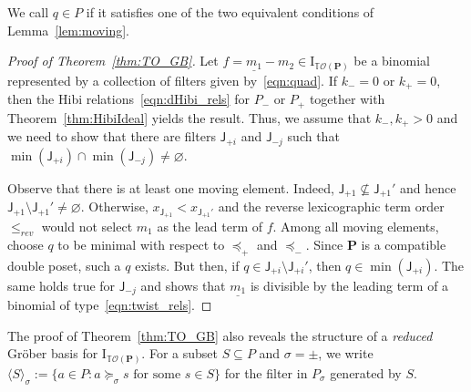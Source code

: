 \documentclass[11pt]{amsart}
\theoremstyle{definition}
\begin{document}
We call $q \in {P}$ {\textbf{\color{black}{moving}}} if it satisfies one of the two equivalent
conditions of Lemma~\ref{lem:moving}.

\begin{proof}[Proof of Theorem~\ref{thm:TO_GB}]
    Let $f = \underline{m_1} - m_2 \in {\mathrm{I}}_{{{\mathbb{T}}{\mathcal{O}({\mathbf{P}})}}}$ be a binomial represented
    by a collection of filters given by~\eqref{eqn:quad}. If $k_- = 0$ or $k_+
    = 0$, then the Hibi relations~\eqref{eqn:dHibi_rels} for ${P}_-$ or ${P}_+$
    together with Theorem~\ref{thm:HibiIdeal} yields the result. Thus, we
    assume that $k_-,k_+ > 0$ and we need to show that there are filters
    ${\mathsf{J}}_{+i}$ and ${\mathsf{J}}_{-j}$ such that $\min({\mathsf{J}}_{+i}) \cap
    \min({\mathsf{J}}_{-j}) \neq {\varnothing}$.

    Observe that there is at least one moving element. Indeed,
    ${\mathsf{J}}_{+1}\nsubseteq {\mathsf{J}}_{+1}'$ and hence ${\mathsf{J}}_{+1} \setminus
    {\mathsf{J}}_{+1}' \neq {\varnothing}$. Otherwise, $x_{{\mathsf{J}}_{+1}} <
    x_{{\mathsf{J}}_{+1}'}$ and the reverse lexicographic term order ${\le_{rev}}$ would
    not select $m_1$ as the lead term of $f$.  Among all moving elements,
    choose $q$ to be minimal with respect to $\preceq_+$ and $\preceq_-$.
    Since ${\mathbf{P}}$ is a compatible double poset, such a $q$ exists. But then,
    if $q \in {\mathsf{J}}_{+i} \setminus {\mathsf{J}}_{+i}'$, then $q \in
    \min({\mathsf{J}}_{+i})$. The same holds true for ${\mathsf{J}}_{-j}$ and shows that
    $\underline{m_1}$ is divisible by the leading term of a binomial of
    type~\eqref{eqn:twist_rels}.
\end{proof}

The proof of Theorem~\ref{thm:TO_GB} also reveals the structure of a
\emph{reduced} Gr\"ober basis for ${\mathrm{I}}_{{{\mathbb{T}}{\mathcal{O}({\mathbf{P}})}}}$. For a subset $S \subseteq
{P}$ and $\sigma = \pm$, we write ${\langle {S} \rangle}_\sigma := \{ a \in {P} : a
\succeq_\sigma s \text{ for some } s \in S \}$ for the filter in ${P}_\sigma$
generated by $S$.
\end{document}
